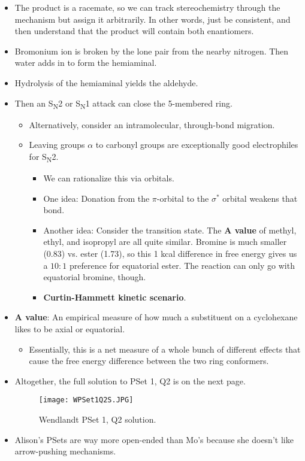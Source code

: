 \documentclass[../notes.tex]{subfiles}
\begin{document}
\begin{itemize}
    \item The product is a racemate, so we can track stereochemistry through the mechanism but assign it arbitrarily. In other words, just be consistent, and then understand that the product will contain both enantiomers.
    \item Bromonium ion is broken by the lone pair from the nearby nitrogen. Then water adds in to form the hemiaminal.
    \item Hydrolysis of the hemiaminal yields the aldehyde.
    \item Then an S\textsubscript{N}2 or S\textsubscript{N}1 attack can close the 5-membered ring.
    \begin{itemize}
        \item Alternatively, consider an intramolecular, through-bond  migration.
        \item Leaving groups $\alpha$ to carbonyl groups are exceptionally good electrophiles for S\textsubscript{N}2.
        \begin{itemize}
            \item We can rationalize this via orbitals.
            \item One idea: Donation from the  $\pi$-orbital to the  $\sigma^*$ orbital weakens that bond.
            \item Another idea: Consider the transition state. The \textbf{A value} of methyl, ethyl, and isopropyl are all quite similar. Bromine is much smaller (0.83) vs. ester (1.73), so this 1 kcal difference in free energy gives us a $10:1$ preference for equatorial ester. The reaction can only go with equatorial bromine, though.
            \item \textbf{Curtin-Hammett kinetic scenario}.
        \end{itemize}
    \end{itemize}
    \item \textbf{A value}: An empirical measure of how much a substituent on a cyclohexane likes to be axial or equatorial.
    \begin{itemize}
        \item Essentially, this is a net measure of a whole bunch of different effects that cause the free energy difference between the two ring conformers.
    \end{itemize}
    \item Altogether, the full solution to PSet 1, Q2 is on the next page.
    \begin{figure}[H]
        \centering
        \texttt{[image: WPSet1Q2S.JPG]}
        \caption{Wendlandt PSet 1, Q2 solution.}
        \label{fig:WPSet1Q2S}
    \end{figure}
    \pagebreak
    \item Alison's PSets are way more open-ended than Mo's because she doesn't like arrow-pushing mechanisms.
\end{itemize}
\end{document}
